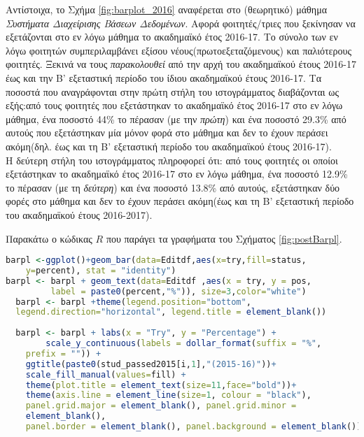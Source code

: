 \documentclass[12pt,a4paper,final]{article}
\begin{document}
Αντίστοιχα, το Σχήμα \ref{fig:barplot_2016} αναφέρεται στο (θεωρητικό) μάθημα \textit{Συστήματα Διαχείρισης Βάσεων Δεδομένων}. Αφορά φοιτητές/τριες που ξεκίνησαν να εξετάζονται στο εν λόγω μάθημα το ακαδημαϊκό έτος 2016-17. Το σύνολο των εν λόγω φοιτητών  συμπεριλαμβάνει εξίσου νέους(πρωτοεξεταζόμενους) και παλιότερους φοιτητές. Ξεκινά να τους \textit{παρακολουθεί} από την αρχή του ακαδημαϊκού έτους 2016-17 έως και την Β' εξεταστική περίοδο του ίδιου ακαδημαϊκού έτους 2016-17. Τα ποσοστά που αναγράφονται στην πρώτη στήλη του ιστογράμματος διαβάζονται ως εξής:από τους φοιτητές που εξετάστηκαν  το ακαδημαϊκό έτος 2016-17 στο εν λόγω μάθημα, ένα ποσοστό 44\% το πέρασαν (με την \textit{πρώτη}) και ένα ποσοστό   29.3\% από αυτούς που εξετάστηκαν μία μόνον φορά στο μάθημα και δεν το έχουν περάσει ακόμη(δηλ. έως και τη Β' εξεταστική περίοδο  του ακαδημαϊκού έτους 2016-17).\\
Η δεύτερη στήλη του ιστογράμματος πληροφορεί ότι: από τους φοιτητές οι οποίοι εξετάστηκαν το ακαδημαϊκό έτος  2016-17 στο εν λόγω μάθημα, ένα ποσοστό 12.9\%  το πέρασαν (με τη \textit{δεύτερη}) και ένα ποσοστό 13.8\%  από αυτούς, εξετάστηκαν δύο φορές στο μάθημα και δεν το έχουν περάσει ακόμη(έως και τη Β' εξεταστική περίοδο του ακαδημαϊκού έτους 2016-2017).\medskip

Παρακάτω ο κώδικας $R$ που παράγει τα  γραφήματα του Σχήματος \ref{fig:postBarpl}.

\begin{lstlisting}[language=R]
barpl <-ggplot()+geom_bar(data=Editdf,aes(x=try,fill=status,
	y=percent), stat = "identity")
barpl <- barpl + geom_text(data=Editdf ,aes(x = try, y = pos,
         label = paste0(percent,"%")), size=3,color="white")
  barpl <- barpl +theme(legend.position="bottom", 
  legend.direction="horizontal", legend.title = element_blank())
                        
  barpl <- barpl + labs(x = "Try", y = "Percentage") +
        scale_y_continuous(labels = dollar_format(suffix = "%",
    prefix = "")) +
    ggtitle(paste0(stud_passed2015[i,1],"(2015-16)"))+
    scale_fill_manual(values=fill) +
	theme(plot.title = element_text(size=11,face="bold"))+
    theme(axis.line = element_line(size=1, colour = "black"),
    panel.grid.major = element_blank(), panel.grid.minor =
    element_blank(),
    panel.border = element_blank(), panel.background = element_blank()) 
\end{lstlisting}
\end{document}
